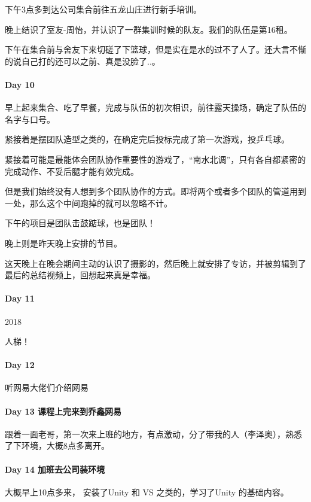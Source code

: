 \documentclass[UTF8,a4paper,8pt]{ctexart}
\begin{document}
		 下午3点多到达公司集合前往五龙山庄进行新手培训。
		 
		 晚上结识了室友-周怡，并认识了一群集训时候的队友。我们的队伍是第16租。
		 
		 下午在集合前与舍友下来切磋了下篮球，但是实在是水的过不了人了。还大言不惭的说自己打的还可以之前、真是没脸了..。
		 
 	 \paragraph{Day 10      \quad     }
	 	 早上起来集合、吃了早餐，完成与队伍的初次相识，前往露天操场，确定了队伍的名字与口号。
	 	 
	 	 紧接着是摆团队造型之类的，在确定完后投标完成了第一次游戏，投乒乓球。
	 	 
	 	 紧接着可能是最能体会团队协作重要性的游戏了，“南水北调”，只有各自都紧密的完成动作、不妥后腿才能有效完成。
	 	 
	 	 但是我们始终没有人想到多个团队协作的方式。即将两个或者多个团队的管道用到一处，那么这个中间跑掉的就可以忽略不计。
	 	 
	 	 下午的项目是团队击鼓踮球，也是团队！
	 	 
	 	 晚上则是昨天晚上安排的节目。
	 	 
	 	 这天晚上在晚会期间主动的认识了摄影的，然后晚上就安排了专访，并被剪辑到了最后的总结视频上，回想起来真是幸福。
 	 \paragraph{Day 11      \quad     }
	 	 2018
	 	 
	 	 人梯！
 	 
 	 \paragraph{Day 12      \quad     }
	 	 听网易大佬们介绍网易
	 	 
 	 \paragraph{Day 13   课程上完来到乔鑫网易   \quad     }
 	 	跟着一面老哥，第一次来上班的地方，有点激动，分了带我的人（李泽奥），熟悉了下环境，大概8点多离开。
 	 
 	 \paragraph{Day 14   加班去公司装环境   \quad     }
 	 	大概早上10点多来， 安装了Unity 和 VS 之类的，学习了Unity 的基础内容。
 	 	
\end{document}
